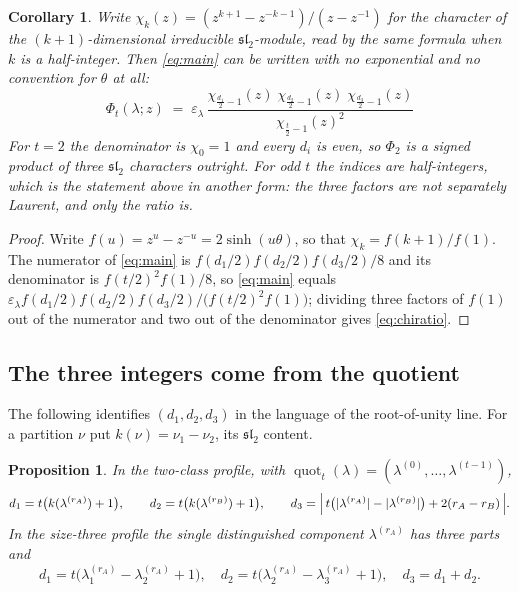 \documentclass[11pt,reqno]{amsart}
\theoremstyle{plain}
\newtheorem{corollary}[theorem]{Corollary}
\newtheorem{proposition}[theorem]{Proposition}
\theoremstyle{definition}
\newcommand{\quot}{\operatorname{quot}}
\begin{document}
\begin{corollary}\label{cor:chars}
Write $\chi_k(z)=(z^{k+1}-z^{-k-1})/(z-z^{-1})$ for the character of the $(k+1)$-dimensional
irreducible $\mathfrak{sl}_2$-module, read by the same formula when $k$ is a half-integer. Then
\eqref{eq:main} can be written with no exponential and no convention for $\theta$ at all:
\begin{equation}\label{eq:chiratio}
\boxed{\;\;\Phi_t(\lambda;z)\;=\;\varepsilon_\lambda\,
\frac{\chi_{\frac{d_1}{2}-1}(z)\;\chi_{\frac{d_2}{2}-1}(z)\;\chi_{\frac{d_3}{2}-1}(z)}
{\chi_{\frac{t}{2}-1}(z)^{2}}\;\;}
\end{equation}
For $t=2$ the denominator is $\chi_0=1$ and every $d_i$ is even, so $\Phi_2$ is a signed product of
three $\mathfrak{sl}_2$ characters outright. For odd $t$ the indices are half-integers, which is the
statement above in another form: the three factors are not separately Laurent, and only the ratio is.
\end{corollary}

\begin{proof}
Write $f(u)=z^{u}-z^{-u}=2\sinh(u\theta)$, so that $\chi_k=f(k+1)/f(1)$. The numerator of
\eqref{eq:main} is $f(d_1/2)f(d_2/2)f(d_3/2)/8$ and its denominator is $f(t/2)^2f(1)/8$, so
\eqref{eq:main} equals $\varepsilon_\lambda f(d_1/2)f(d_2/2)f(d_3/2)/\bigl(f(t/2)^2f(1)\bigr)$;
dividing three factors of $f(1)$ out of the numerator and two out of the denominator gives
\eqref{eq:chiratio}.
\end{proof}

\subsection{The three integers come from the quotient}
The following identifies $(d_1,d_2,d_3)$ in the language of the root-of-unity line. For a partition
$\nu$ put $k(\nu)=\nu_1-\nu_2$, its $\mathfrak{sl}_2$ content.

\begin{proposition}\label{prop:quotient}
In the two-class profile, with $\quot_t(\lambda)=(\lambda^{(0)},\dots,\lambda^{(t-1)})$,
\[
d_1=t\bigl(k(\lambda^{(r_A)})+1\bigr),\qquad
d_2=t\bigl(k(\lambda^{(r_B)})+1\bigr),\qquad
d_3=\Bigl|\,t\bigl(|\lambda^{(r_A)}|-|\lambda^{(r_B)}|\bigr)+2(r_A-r_B)\,\Bigr| .
\]
In the size-three profile the single distinguished component $\lambda^{(r_A)}$ has three parts and
\[
d_1=t\bigl(\lambda^{(r_A)}_1-\lambda^{(r_A)}_2+1\bigr),\quad
d_2=t\bigl(\lambda^{(r_A)}_2-\lambda^{(r_A)}_3+1\bigr),\quad d_3=d_1+d_2 .
\]
\end{proposition}
\end{document}
